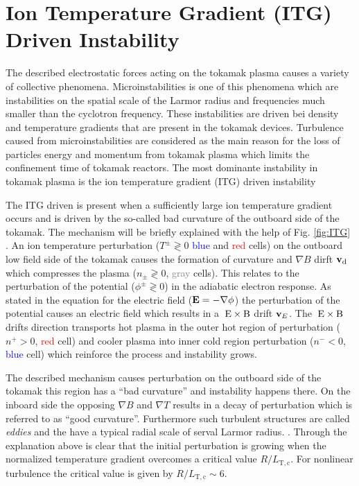 \newpage
\section{Ion Temperature Gradient (ITG) Driven Instability}
\label{sec:ITG}

The described electrostatic forces acting on the tokamak plasma causes a variety of collective phenomena. Microinstabilities is one of this phenomena which are instabilities on the spatial scale of the Larmor radius and frequencies much smaller than the cyclotron frequency. These instabilities are driven bei density and temperature gradients that are present in the tokamak devices. Turbulence caused from microinstabilities are considered as the main reason for the loss of particles energy and momentum from tokamak plasma \cite{Brizard2007, Garbet2010, Horton1999} which limits the confinement time of tokamak reactors. The most dominante instability in tokamak plasma is the ion temperature gradient (ITG) driven instability \cite{Coppi1967, Cowley1991, Rudakov1961}


The ITG driven is present when a sufficiently large ion temperature gradient occurs and is driven by the so-called bad curvature of the outboard side of the tokamak. The mechanism will be briefly explained with the help of Fig. \ref{fig:ITG} \cite{Beer_PHD, Casson_PHD, Dannert_PHD}. An ion temperature perturbation ($T^\pm \gtrless 0$ \textcolor{blue}{blue} and \textcolor{red}{red} cells) on the outboard low field side of the tokamak causes the formation of curvature and $\nabla B$ dirft $\boldsymbol{\mathbf{v}}_\mathrm{d}$ which compresses the plasma ($n_\pm \gtrless 0$, \textcolor{gray}{gray} cells). This relates to the perturbation of the potential ($\phi^\pm  \gtrless 0$) in the adiabatic electron response. As stated in the equation for the electric field ($\boldsymbol{\mathbf{E}} = -\nabla \phi$) the perturbation of the potential causes an electric field which results in a $\mathrm{\:E}\times\mathrm{B}$ drift $\boldsymbol{\mathbf{v}}_E$. The $\mathrm{\:E}\times\mathrm{B}$ drifts direction transports hot plasma in the outer hot region of perturbation ($n^+ > 0$, \textcolor{red}{red} cell) and cooler plasma into inner cold region perturbation ($n^- < 0$, \textcolor{blue}{blue} cell) which reinforce the process and instability grows.\bigskip

The described mechanism causes perturbation on the outboard side of the tokamak this region has a \enquote{bad curvature} and instability happens there. On the inboard side the opposing $\nabla B$ and $\nabla T$ results in a decay of perturbation which is referred to as \enquote{good curvature}. Furthermore such turbulent structures are called \textit{eddies} and the have a typical radial scale of serval Larmor radius. \cite{Newins2006}. 
Through the explanation above is clear that the initial perturbation is growing when the normalized temperature gradient overcomes a critical value $R/L_\mathrm{T,c}$. For nonlinear turbulence the critical value is given by $R/L_\mathrm{T,c} \sim 6$. \cite{Dimits2000, Isliker2010}